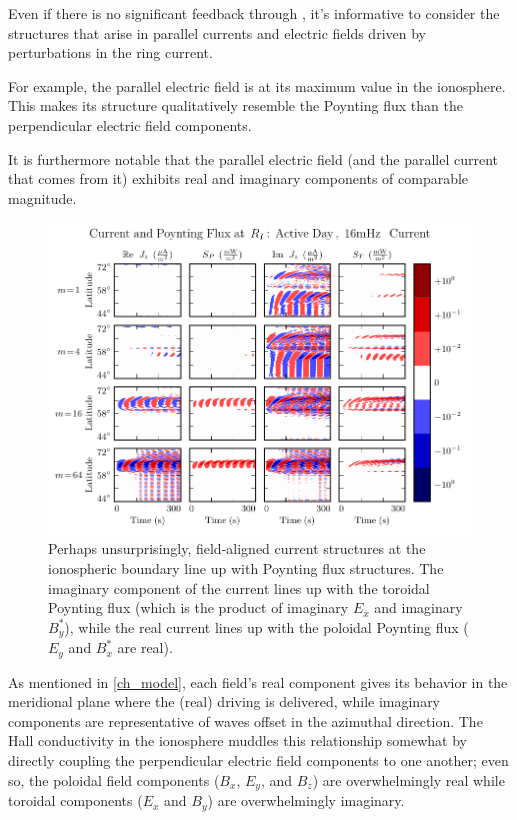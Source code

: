 Even if there is no significant feedback through \farlaw, it's informative to consider the structures that arise in parallel currents and electric fields driven by perturbations in the ring current. 

For example, the parallel electric field is at its maximum value in the ionosphere. This makes its structure qualitatively resemble the Poynting flux than the perpendicular electric field components. 

It is furthermore notable that the parallel electric field (and the parallel current that comes from it) exhibits real and imaginary components of comparable magnitude. 

\begin{figure}[!htb]
    \centering
    \includegraphics[width=\textwidth]{figures/current_poynting_flux.pdf}
    \caption[Current and Poynting Flux at the Ionosphere]{
      Perhaps unsurprisingly, field-aligned current structures at the ionospheric boundary line up with Poynting flux structures. The imaginary component of the current lines up with the toroidal Poynting flux (which is the product of imaginary $E_x$ and imaginary $B_y^*$), while the real current lines up with the poloidal Poynting flux ($E_y$ and $B_x^*$ are real).
    }
    \label{fig_current_poynting_flux}
\end{figure}

As mentioned in \cref{ch_model}, each field's real component gives its behavior in the meridional plane where the (real) driving is delivered, while imaginary components are representative of waves offset in the azimuthal direction. The Hall conductivity in the ionosphere muddles this relationship somewhat by directly coupling the perpendicular electric field components to one another; even so, the poloidal field components ($B_x$, $E_y$, and $B_z$) are overwhelmingly real while toroidal components ($E_x$ and $B_y$) are overwhelmingly imaginary. 


